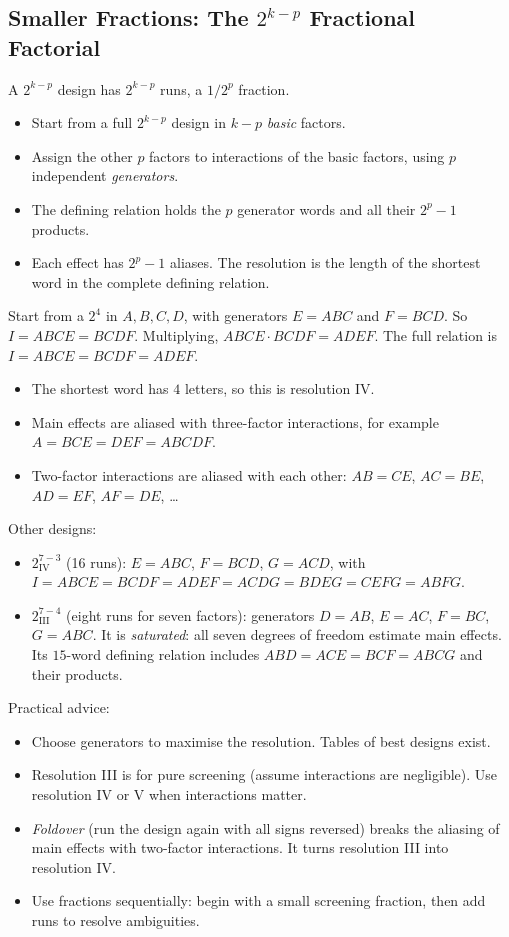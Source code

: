 \subsection{Smaller Fractions: The $2^{k-p}$ Fractional Factorial}

A $2^{k-p}$ design has $2^{k-p}$ runs, a $1/2^p$ fraction.
\begin{itemize}
  \item Start from a full $2^{k-p}$ design in $k-p$ \emph{basic} factors.
  \item Assign the other $p$ factors to interactions of the basic factors, using $p$ independent \emph{generators}.
  \item The defining relation holds the $p$ generator words and all their $2^p-1$ products.
  \item Each effect has $2^p-1$ aliases. The resolution is the length of the shortest word in the complete defining relation.
\end{itemize}

\begin{example}[A $2^{6-2}$ design]
Start from a $2^4$ in $A,B,C,D$, with generators $E=ABC$ and $F=BCD$. So $I=ABCE=BCDF$. Multiplying, $ABCE\cdot BCDF=ADEF$. The full relation is $I=ABCE=BCDF=ADEF$.
\begin{itemize}
  \item The shortest word has $4$ letters, so this is resolution IV.
  \item Main effects are aliased with three-factor interactions, for example $A=BCE=DEF=ABCDF$.
  \item Two-factor interactions are aliased with each other: $AB=CE$, $AC=BE$, $AD=EF$, $AF=DE$, \dots
\end{itemize}
\end{example}

Other designs:
\begin{itemize}
  \item $2^{7-3}_{\mathrm{IV}}$ (16 runs): $E=ABC$, $F=BCD$, $G=ACD$, with $I=ABCE=BCDF=ADEF=ACDG=BDEG=CEFG=ABFG$.
  \item $2^{7-4}_{\mathrm{III}}$ (eight runs for seven factors): generators $D=AB$, $E=AC$, $F=BC$, $G=ABC$. It is \emph{saturated}: all seven degrees of freedom estimate main effects. Its $15$-word defining relation includes $ABD=ACE=BCF=ABCG$ and their products.
\end{itemize}

Practical advice:
\begin{itemize}
  \item Choose generators to maximise the resolution. Tables of best designs exist.
  \item Resolution III is for pure screening (assume interactions are negligible). Use resolution IV or V when interactions matter.
  \item \emph{Foldover} (run the design again with all signs reversed) breaks the aliasing of main effects with two-factor interactions. It turns resolution III into resolution IV.
  \item Use fractions sequentially: begin with a small screening fraction, then add runs to resolve ambiguities.
\end{itemize}

